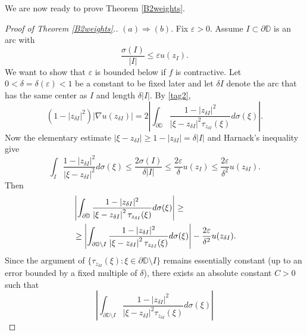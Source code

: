 \documentclass[a4paper,12pt]{article}
\theoremstyle{definition}
\numberwithin{equation}{section}
\newcommand{\D}{\mathbb D}
\begin{document}
\medskip

We are now ready to prove Theorem \ref{B2weights}.

\begin{proof}[Proof of Theorem \ref{B2weights}.]

$(a) \Rightarrow(b)$. Fix $\varepsilon >0$. Assume $I \subset \partial  \mathbb{D}$ is an arc with 
$$
\frac{\sigma(I)}{ |I|} \leq \varepsilon u \left(z_{I}\right) . 
$$ 
We want to show that $\varepsilon$ is bounded below if $f$ is contractive. Let $0<\delta=\delta(\varepsilon)<1$ be a constant to be fixed later and let $\delta I $ denote the arc that has the same center as $I$ and length $\delta |I|$. By \eqref{tag2}, 
\begin{equation}
    \label{tag3}
\left(1-\left|z_{\delta I}\right|^{2}\right)\left|\nabla u\left(z_{\delta I}\right)\right|
 =2 \left| \int_{\partial \D} \frac{1-\left|z_{\delta I}\right|^{2}}{\left|\xi -z_{\delta I}\right|^{2} \tau_{z_{\delta I}} (\xi)} d \sigma (\xi) \right|.\end{equation}
Now the elementary estimate $|\xi - z_{\delta I}| \geq 1- |z_{\delta I}| = \delta |I|$ and Harnack's inequality give
\begin{equation}
    \label{tag311}
    \int_{I} \frac{1-\left|z_{\delta I}\right|^{2}}{\left|\xi-z_{\delta I} \right|^{2}} d \sigma (\xi) \leqslant \frac{ 2 \sigma(I)}{\delta|I|}
 \leqslant \frac{ 2 \varepsilon}{\delta} u \left(z_{I}\right) \leqslant \frac{ 2 \varepsilon}{\delta^{2}} u \left(z_{\delta I}\right). 
\end{equation}
Then
\begin{align}
    \label{estrella}
    & \left|\int_{\partial \D } \frac{1-|z_{\delta I}|^{2}}{\left|\xi-z_{\delta I}\right|^{2} \tau_{z_{\delta I}} (\xi)} d \sigma (\xi)\right|  \geq \\ \notag & \geq\left|\int_{\partial \D \setminus I} \frac{1-|z_{\delta I}|^{2}}{\left|\xi-z_{\delta I}\right|^{2} \tau_{z_{\delta I}} (\xi)} d \sigma (\xi)\right|  - \frac{2 \varepsilon}{\delta^2} u(z_{\delta I}). 
\end{align}
Since the argument of $\{\tau_{z_{\delta I}} (\xi) : \xi \in \partial \mathbb{D} \setminus I \}$ remains essentially constant (up to an error bounded by a fixed multiple of $\delta$), there exists an absolute constant $C>0$ such that 
$$
\left|\int_{\partial \D \setminus I} \frac{1-|z_{\delta I}|^{2}}{\left|\xi-z_{\delta I}\right|^{2} \tau_{z_{\delta I}} (\xi)} d \sigma (\xi)\right|  
$$
\end{proof}
\end{document}
